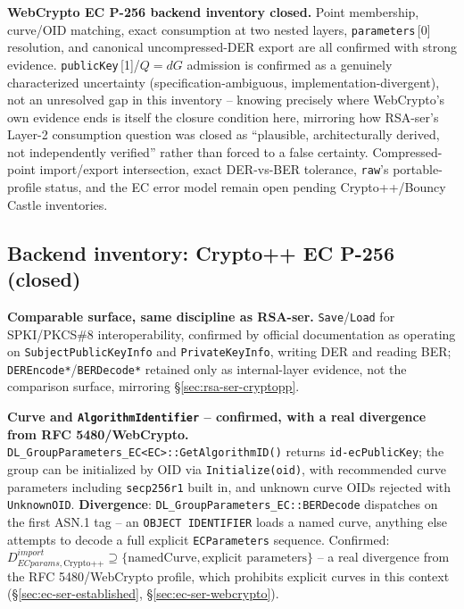 \documentclass[11pt,a4paper]{article}
\begin{document}
\textbf{WebCrypto EC P-256 backend inventory closed.} Point membership, curve/OID matching, exact consumption at two nested layers, \texttt{parameters}\,[0] resolution, and canonical uncompressed-DER export are all confirmed with strong evidence. \texttt{publicKey}\,[1]/$Q=dG$ admission is confirmed as a genuinely characterized uncertainty (specification-ambiguous, implementation-divergent), not an unresolved gap in this inventory -- knowing precisely where WebCrypto's own evidence ends is itself the closure condition here, mirroring how RSA-ser's Layer-2 consumption question was closed as ``plausible, architecturally derived, not independently verified'' rather than forced to a false certainty. Compressed-point import/export intersection, exact DER-vs-BER tolerance, \texttt{raw}'s portable-profile status, and the EC error model remain open pending Crypto++/Bouncy Castle inventories.

\subsection{Backend inventory: Crypto++ EC P-256 (closed)}\label{sec:ec-ser-cryptopp}

\textbf{Comparable surface, same discipline as RSA-ser.} \texttt{Save}/\texttt{Load} for SPKI/PKCS\#8 interoperability, confirmed by official documentation as operating on \texttt{SubjectPublicKeyInfo} and \texttt{PrivateKeyInfo}, writing DER and reading BER; \texttt{DEREncode*}/\texttt{BERDecode*} retained only as internal-layer evidence, not the comparison surface, mirroring \S\ref{sec:rsa-ser-cryptopp}.

\textbf{Curve and \texttt{AlgorithmIdentifier} -- confirmed, with a real divergence from RFC 5480/WebCrypto.} \texttt{DL\_GroupParameters\_EC<EC>::GetAlgorithmID()} returns \texttt{id-ecPublicKey}; the group can be initialized by OID via \texttt{Initialize(oid)}, with recommended curve parameters including \texttt{secp256r1} built in, and unknown curve OIDs rejected with \texttt{UnknownOID}. \textbf{Divergence}: \texttt{DL\_GroupParameters\_EC::BERDecode} dispatches on the first ASN.1 tag -- an \texttt{OBJECT IDENTIFIER} loads a named curve, anything else attempts to decode a full explicit \texttt{ECParameters} sequence. Confirmed: $D_{ECparams,\text{Crypto++}}^{import} \supseteq \{\text{namedCurve}, \text{explicit parameters}\}$ -- a real divergence from the RFC 5480/WebCrypto profile, which prohibits explicit curves in this context (\S\ref{sec:ec-ser-established}, \S\ref{sec:ec-ser-webcrypto}).
\end{document}

